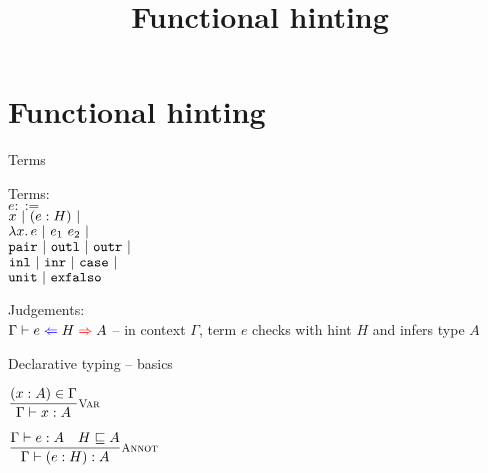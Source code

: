 \documentclass{beamer}
\title{Functional hinting}
\date{}
\begin{document}
\newcommand{\funpair}{\texttt{pair}}
\newcommand{\funoutl}{\texttt{outl}}
\newcommand{\funoutr}{\texttt{outr}}
\newcommand{\funinl}{\texttt{inl}}
\newcommand{\funinr}{\texttt{inr}}
\newcommand{\funcase}{\texttt{case}}
\newcommand{\funexfalso}{\texttt{exfalso}}

\frame{\titlepage}

\section{Functional hinting}

\begin{frame}{Terms}

Terms: \\
$e ::=$ \\
\qquad $x \pipe \annot{e}{H} \pipe $ \\
\qquad $\fun{x}{e} \pipe \app{e_1}{e_2} \pipe$ \\
\qquad $\funpair \pipe \funoutl \pipe \funoutr \pipe$ \\
\qquad $\funinl \pipe \funinr \pipe \funcase \pipe$ \\
\qquad $\unit \pipe \funexfalso$

\vspace{2em}

Judgements: \\
$\fullhinting{\Gamma}{e}{H}{A}$ -- in context $\Gamma$, term $e$ checks with hint $H$ and infers type $A$

\end{frame}

\begin{frame}{Declarative typing -- basics}

\begin{center}
  $\infrule[Var]{\sidecond{(x : A) \in \Gamma}}{\typing{x}{A}}$

  \vspace{2em}

  $\infrule[Annot]{\typing{e}{A} \quad \sidecond{\hintorder{H}{A}}}{\typing{\annot{e}{H}}{A}}$
\end{center}

\end{frame}
\end{document}
